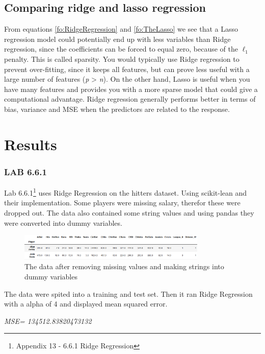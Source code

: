 \subsection{Comparing ridge and lasso regression}

From equations \ref{fo:RidgeRegression} and \ref{fo:TheLasso} we see that a Lasso regression model could potentially end up with less variables than Ridge regression, since the coefficients can be forced to equal zero, because of the $\ell_1$ penalty. This is called sparsity. You would typically use Ridge regression to prevent over-fitting, since it keeps all features, but can prove less useful with a large number of features (\textit{p} > \textit{n}). On the other hand, Lasso is useful when you have many features and provides you with a more sparse model that could give a computational advantage. Ridge regression generally performs better in terms of bias, variance and MSE when the predictors are related to the response. %

\section{Results}
\subsubsection*{LAB 6.6.1}
Lab 6.6.1\footnote{Appendix 13 - 6.6.1 Ridge Regression} uses Ridge Regression on the hitters dataset. Using scikit-lean and their implementation. Some players were missing salary, therefor these were dropped out. The data also contained some string values and using pandas they were converted  into dummy variables.  
\begin{figure}[H]
	\centering
	\includegraphics[width=0.8\textwidth]{shrinkageMethods/fig/data.png}
	\caption{The data after removing missing values and making strings into dummy variables }
	\label{fig:lab661_data}
\end{figure}
The data were spited into a training and test set. Then it ran Ridge Regression with a alpha of 4 and displayed mean squared error.


\noindent\textit{MSE= 134512.83820473132}

